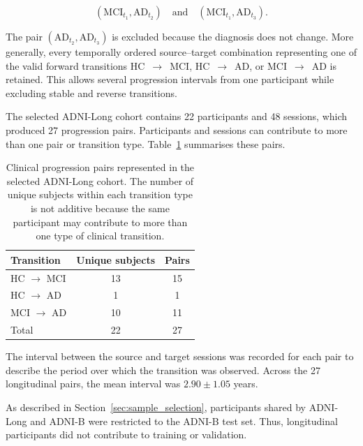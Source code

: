 \begin{equation}
    \left(
        \mathrm{MCI}_{t_1},
        \mathrm{AD}_{t_2}
    \right)
    \quad \text{and} \quad
    \left(
        \mathrm{MCI}_{t_1},
        \mathrm{AD}_{t_3}
    \right).
\end{equation}

The pair $\left(\mathrm{AD}_{t_2},\mathrm{AD}_{t_3}\right)$ is excluded
because the diagnosis does not change. More generally, every temporally ordered source--target combination
representing one of the valid forward transitions
HC~$\rightarrow$~MCI, HC~$\rightarrow$~AD, or
MCI~$\rightarrow$~AD is retained. This allows several
progression intervals from one participant while excluding stable and
reverse transitions.

The selected ADNI-Long cohort contains 22 participants and 48 sessions,
which produced 27 progression pairs. Participants and sessions can
contribute to more than one pair or transition type.
Table~\ref{tab:longitudinal_transitions} summarises these pairs.

\begin{table}[ht]
    \centering
    \caption{Clinical progression pairs represented in the selected
    ADNI-Long cohort. The number of unique subjects within each
    transition type is not additive because the same participant may
    contribute to more than one type of clinical transition.}
    \label{tab:longitudinal_transitions}
    \begin{tabular}{lcc}
        \hline
        Transition & Unique subjects & Pairs \\
        \hline
        HC $\rightarrow$ MCI & 13 & 15 \\
        HC $\rightarrow$ AD  & 1  & 1  \\
        MCI $\rightarrow$ AD & 10 & 11 \\
        \hline
        Total & 22 & 27 \\
        \hline
    \end{tabular}
\end{table}

The interval between the source and target sessions was recorded for
each pair to describe the period over which the transition was observed.
Across the 27 longitudinal pairs, the mean interval was $2.90 \pm 1.05$ years.

As described in Section~\ref{sec:sample_selection}, participants shared
by ADNI-Long and ADNI-B were restricted to the ADNI-B test set. Thus,
longitudinal participants did not contribute to training or validation.

